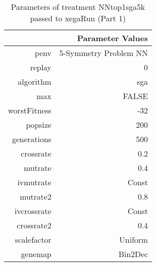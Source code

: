 \begin{table}[ht]
\centering
\begin{tabular}{rr}
  \hline
 & Parameter Values \\ 
  \hline
penv & 5-Symmetry Problem NN \\ 
  replay & 0 \\ 
  algorithm & sga \\ 
  max & FALSE \\ 
  worstFitness & -32 \\ 
  popsize & 200 \\ 
  generations & 500 \\ 
  crossrate & 0.2 \\ 
  mutrate & 0.4 \\ 
  ivmutrate & Const \\ 
  mutrate2 & 0.8 \\ 
  ivcrossrate & Const \\ 
  crossrate2 & 0.4 \\ 
  scalefactor & Uniform \\ 
  genemap & Bin2Dec \\ 
   \hline
\end{tabular}
\caption{ Parameters of treatment NNtop1sga5k passed to xegaRun
 (Part 1)} 
\end{table}
